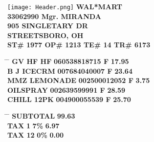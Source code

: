 \documentclass{article}
\begin{document}
\pagestyle{empty}

\newcommand{\receiptfontsize}{\fontsize{10}{9}\selectfont}
\receiptfontsize

\begin{center}
    \texttt{[image: Header.png]} %
    \textbf{WAL*MART}\\
    \textbf{33062990 Mgr. MIRANDA}\\
    \textbf{905 SINGLETARY DR}\\
    \textbf{STREETSBORO, OH}\\
    \textbf{ST\# 1977 OP\# 1213 TE\# 14 TR\# 6173}\\
    
    \vspace{1mm}

    \begin{tabbing}
        \hspace{2.5cm} \= \hspace{3.7cm} \= \kill
        \textbf{GV HF HF} \> \textbf{060538818715 F} \> \textbf{17.95}\\
        \textbf{B J ICECRM} \> \textbf{007684040007 F} \> \textbf{23.64}\\
        \textbf{MMZ LEMONADE} \> \textbf{002500012052 F} \> \textbf{3.75}\\
        \textbf{OILSPRAY} \> \textbf{002639599991 F} \> \textbf{28.59}\\
        \textbf{CHILL 12PK} \> \textbf{004900055539 F} \> \textbf{25.70}\\
    \end{tabbing}
    \vspace{-9mm}
    \hspace{2.5cm}\begin{tabbing}
        \hspace{2cm} \= \hspace{2.4cm} \= \kill
        \textbf{\hspace{4cm}SUBTOTAL} \> \textbf{\hspace{4.3cm} 99.63} \\
        \textbf{\hspace{2.5cm}TAX} \hspace{-0.25mm} \textbf{1} \> \textbf{\hspace{2.5cm}7\%} \> \textbf{\hspace{1.90cm} 6.97} \\
        \textbf{\hspace{2.5cm}TAX 12} \> \textbf{\hspace{2.5cm}0\%} \> \textbf{\hspace{2.1cm}0.00} \\

\end{tabbing}
\end{center}
\end{document}
